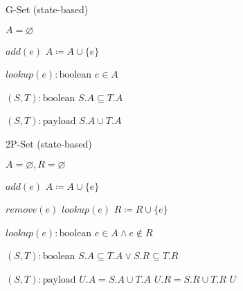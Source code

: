 \begin{algorithm}[t]
\small{
	\caption{G-Set (state-based)}
 	\label{alg:g_set_state_based}                       

 	\begin{algorithmic}[1]
 	  \State \Payload $A = \varnothing$
 	  
 	  \State \Update $add(e)$
 	  \State \hspace{\algorithmicindent} $A \coloneqq A \cup \{e\}$
 	  
 	  \State \Query $lookup(e) : \text{boolean}$
 	  \State \hspace{\algorithmicindent} \Return $e \in A$
 	  
 	  \State \Compare $(S, T) : \text{boolean}$
 	  \State \hspace{\algorithmicindent} \Return $S.A \subseteq T.A$
 	  
 	  \State \Merge $(S, T) : \text{payload}$
 	  \State \hspace{\algorithmicindent} \Return $S.A \cup T.A$
	\end{algorithmic}
 }
\end{algorithm}
\begin{algorithm}[t]
\small{
	\caption{2P-Set (state-based)}
 	\label{alg:2p_set_state_based}                       

 	\begin{algorithmic}[1]
 	  \State \Payload $A = \varnothing, R = \varnothing$
 	  
 	  \State \Update $add(e)$
 	  \State \hspace{\algorithmicindent} $A \coloneqq A \cup \{e\}$
 	  
 	  \State \Update $remove(e)$
 	  \State \hspace{\algorithmicindent} \Pre $lookup(e)$
 	  \State \hspace{\algorithmicindent} $R \coloneqq R \cup \{e\}$
 	  
 	  \State \Query $lookup(e) : \text{boolean}$
 	  \State \hspace{\algorithmicindent} \Return $e \in A \land e \not\in R$
 	  
 	  \State \Compare $(S, T) : \text{boolean}$
 	  \State \hspace{\algorithmicindent} \Return $S.A \subseteq T.A \lor S.R \subseteq T.R$ 
 	  
 	  \State \Merge $(S, T) : \text{payload}$
 	  \State \hspace{\algorithmicindent} \Let $U.A = S.A \cup T.A$
 	  \State \hspace{\algorithmicindent} \Let $U.R = S.R \cup T.R$
 	  \State \hspace{\algorithmicindent} \Return $U$
	\end{algorithmic}
 }
\end{algorithm}

